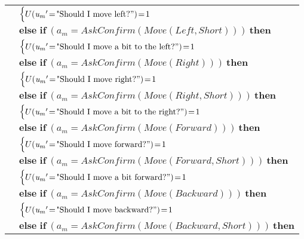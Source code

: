 \begin{footnotesize}
\begin{longtable}{p{2cm}l}
& \;\;\;\;\; $ \begin{cases}U(\mathit{u_m}'\!=\!\text{"Should I move left?}")\!=\!1 \end{cases}$ \vspace{1mm} \\ & $ \textbf{else if} \ (\mathit{a_m}\!=\!\mathit{AskConfirm(Move(Left,Short))}) \ \textbf{then}$ \\
& \;\;\;\;\; $ \begin{cases}U(\mathit{u_m}'\!=\!\text{"Should I move a bit to the left?}")\!=\!1 \end{cases}$ \vspace{1mm} \\ & $ \textbf{else if} \ (\mathit{a_m}\!=\!\mathit{AskConfirm(Move(Right))}) \ \textbf{then}$ \\
& \;\;\;\;\; $ \begin{cases}U(\mathit{u_m}'\!=\!\text{"Should I move right?}")\!=\!1 \end{cases}$ \vspace{1mm} \\ & $ \textbf{else if} \ (\mathit{a_m}\!=\!\mathit{AskConfirm(Move(Right,Short))}) \ \textbf{then}$ \\
& \;\;\;\;\; $ \begin{cases}U(\mathit{u_m}'\!=\!\text{"Should I move a bit to the right?}")\!=\!1 \end{cases}$ \vspace{1mm} \\ & $ \textbf{else if} \ (\mathit{a_m}\!=\!\mathit{AskConfirm(Move(Forward))}) \ \textbf{then}$ \\
& \;\;\;\;\; $ \begin{cases}U(\mathit{u_m}'\!=\!\text{"Should I move forward?}")\!=\!1 \end{cases}$ \vspace{1mm} \\ & $ \textbf{else if} \ (\mathit{a_m}\!=\!\mathit{AskConfirm(Move(Forward,Short))}) \ \textbf{then}$ \\
& \;\;\;\;\; $ \begin{cases}U(\mathit{u_m}'\!=\!\text{"Should I move a bit forward?}")\!=\!1 \end{cases}$ \vspace{1mm} \\ & $ \textbf{else if} \ (\mathit{a_m}\!=\!\mathit{AskConfirm(Move(Backward))}) \ \textbf{then}$ \\
& \;\;\;\;\; $ \begin{cases}U(\mathit{u_m}'\!=\!\text{"Should I move backward?}")\!=\!1 \end{cases}$ \vspace{1mm} \\ & $ \textbf{else if} \ (\mathit{a_m}\!=\!\mathit{AskConfirm(Move(Backward,Short))}) \ \textbf{then}$ \\

\end{longtable}
\end{footnotesize}
